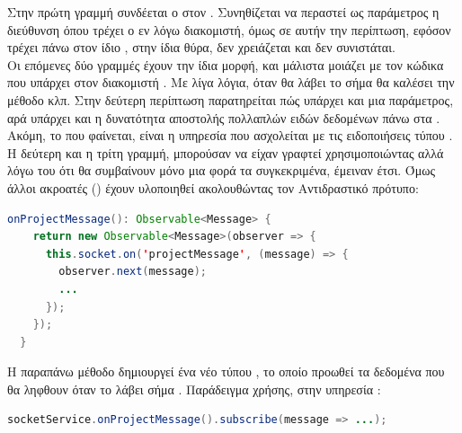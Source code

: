 \pSpace Στην πρώτη γραμμή συνδέεται ο  στον . Συνηθίζεται να περαστεί ως παράμετρος η διεύθυνση όπου τρέχει ο εν λόγω διακομιστή, όμως σε αυτήν την περίπτωση, εφόσον τρέχει πάνω στον ίδιο , στην ίδια θύρα, δεν χρειάζεται και δεν συνιστάται.\\
\pSpace Οι επόμενες δύο γραμμές έχουν την ίδια μορφή, και μάλιστα μοιάζει με τον κώδικα που υπάρχει στον διακομιστή . Με λίγα λόγια, όταν θα λάβει το σήμα  θα καλέσει την μέθοδο  κλπ.
Στην δεύτερη περίπτωση παρατηρείται πώς υπάρχει και μια παράμετρος, αρά υπάρχει και η δυνατότητα αποστολής πολλαπλών ειδών δεδομένων πάνω στα . Ακόμη, το  που φαίνεται, είναι η υπηρεσία που ασχολείται με τις ειδοποιήσεις τύπου .\\
\pSpace Η δεύτερη και η τρίτη γραμμή, μπορούσαν να είχαν γραφτεί χρησιμοποιώντας  αλλά λόγω του ότι θα συμβαίνουν μόνο μια φορά τα συγκεκριμένα, έμειναν έτσι. Όμως άλλοι ακροατές () έχουν υλοποιηθεί ακολουθώντας τον Αντιδραστικό πρότυπο:\\

	\begin{lstlisting}[language=Java]
onProjectMessage(): Observable<Message> {
    return new Observable<Message>(observer => {
      this.socket.on('projectMessage', (message) => {
        observer.next(message);
        ...
      });
    });
  }
	\end{lstlisting}

\pSpace Η παραπάνω μέθοδο δημιουργεί ένα νέο  τύπου , το οποίο προωθεί τα δεδομένα που θα ληφθουν όταν το  λάβει σήμα . Παράδειγμα χρήσης, στην υπηρεσία :\\

	\begin{lstlisting}[language=Java]
socketService.onProjectMessage().subscribe(message => ...);
	\end{lstlisting}
